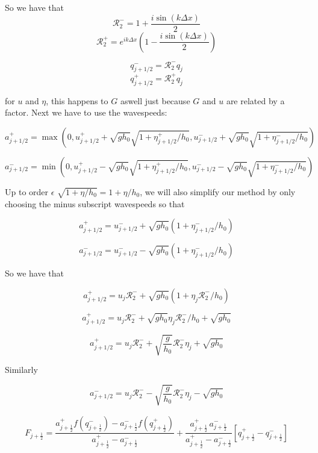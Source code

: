 \documentclass[12pt]{article}
\begin{document}
So we have that
\[\mathcal{R}_2^- = 1  + \frac{i\sin\left(k\Delta x\right)}{2}\]
\[\mathcal{R}_2^+ = e^{ik\Delta x}\left(1  - \frac{i\sin\left(k\Delta x\right)}{2} \right)\]

\[q^-_{j + 1/2} = \mathcal{R}_2^- q_j\]
\[q^+_{j + 1/2} = \mathcal{R}_2^+ q_j\]

for $u$ and $\eta$, this happens to $G$ aswell just because $G$ and $u$ are related by a factor. Next we have to use the wavespeeds:

\[a^+_{j+ 1/2} = \max\left(0,u^+_{j+ 1/2} + \sqrt{gh_0}\sqrt{1 + \eta^+_{j+ 1/2}  / h_0} ,u^-_{j+ 1/2} + \sqrt{gh_0}\sqrt{1 + \eta^-_{j+ 1/2}  / h_0} \right)\]

\[a^-_{j+ 1/2} = \min\left(0,u^+_{j+ 1/2} - \sqrt{gh_0}\sqrt{1 + \eta^+_{j+ 1/2} / h_0} ,u^-_{j+ 1/2} - \sqrt{gh_0}\sqrt{1 + \eta^-_{j+ 1/2} / h_0} \right)\]

Up to order $\epsilon$ $\sqrt{1 + \eta / h_0} =  1 + \eta / h_0$, we will also simplify our method by only choosing the minus subscript wavespeeds so that

\[a^+_{j+ 1/2} = u^-_{j+ 1/2} + \sqrt{gh_0}\left( 1 + \eta^-_{j+ 1/2} / h_0 \right)\]

\[a^-_{j+ 1/2} = u^-_{j+ 1/2} - \sqrt{gh_0}\left( 1 + \eta^-_{j+ 1/2} / h_0 \right)\]

So we have that

\[a^+_{j+ 1/2} = u_{j}\mathcal{R}_2^- + \sqrt{gh_0}\left( 1 + \eta_{j}\mathcal{R}_2^- / h_0 \right)\]

\[a^+_{j+ 1/2} = u_{j}\mathcal{R}_2^- + \sqrt{gh_0} \eta_{j}\mathcal{R}_2^- / h_0+ \sqrt{gh_0}\]

\[a^+_{j+ 1/2} = u_{j}\mathcal{R}_2^- + \sqrt{\frac{g}{h_0}} \mathcal{R}_2^- \eta_{j} + \sqrt{gh_0}\]

Similarly

\[a^-_{j+ 1/2} = u_{j}\mathcal{R}_2^- - \sqrt{\frac{g}{h_0}} \mathcal{R}_2^- \eta_{j} - \sqrt{gh_0}\]

\begin{gather}
F_{j+\frac{1}{2}} = \dfrac{a^+_{j+\frac{1}{2}} f\left(q^-_{j+\frac{1}{2}}\right) - a^-_{j+\frac{1}{2}} f\left(q^+_{j+\frac{1}{2}}\right)}{a^+_{j+\frac{1}{2}} - a^-_{j+\frac{1}{2}}}  + \dfrac{a^+_{j+\frac{1}{2}} \, a^-_{j+\frac{1}{2}}}{a^+_{j+\frac{1}{2}} - a^-_{j+\frac{1}{2}}} \left [ q^+_{j+\frac{1}{2}} - q^-_{j+\frac{1}{2}} \right ]
\end{gather}
\end{document}
